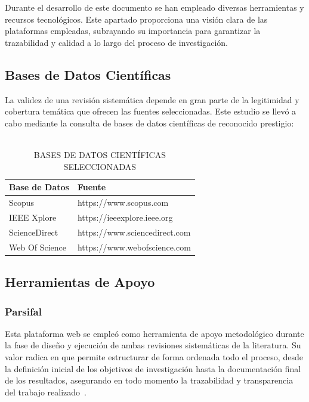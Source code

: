 \chapter{\materialsname}

Durante el desarrollo de este documento se han empleado diversas 
herramientas y recursos tecnológicos. Este apartado proporciona una visión clara de las plataformas empleadas, subrayando su importancia para garantizar la trazabilidad y calidad a lo largo del proceso de investigación.

\section{Bases de Datos Científicas} 

La validez de una revisión sistemática depende en gran parte de la legitimidad y cobertura temática 
que ofrecen las fuentes seleccionadas. Este estudio se llevó a cabo mediante la consulta de bases de 
datos científicas de reconocido prestigio:

\begin{table}[H]
\centering
\caption[Bases De Datos Científicas Seleccionadas]{%
    \vspace{4pt}
    \fontsize{9}{11}\selectfont \\
    BASES DE DATOS CIENTÍFICAS SELECCIONADAS \\[2pt] %
}
\label{tab:bases_de_datos}
\begin{tabular}{@{} l l @{}}
\hline\hline
\textbf{Base de Datos} & \textbf{Fuente} \\
\hline
Scopus             & https://www.scopus.com \\
IEEE Xplore        & https://ieeexplore.ieee.org \\
ScienceDirect      & https://www.sciencedirect.com \\
Web Of Science     & https://www.webofscience.com \\
\hline\hline
\end{tabular}
\end{table}

\section{Herramientas de Apoyo} 
\subsection{Parsifal}
Esta plataforma web se empleó como herramienta de apoyo metodológico durante la fase de diseño y ejecución de ambas revisiones sistemáticas de la literatura. Su valor radica en que permite estructurar de forma ordenada todo el proceso, desde la definición inicial de los objetivos de investigación hasta la documentación final de los resultados, asegurando en todo momento la trazabilidad y transparencia del trabajo realizado~\cite{ParsifalSite}.


